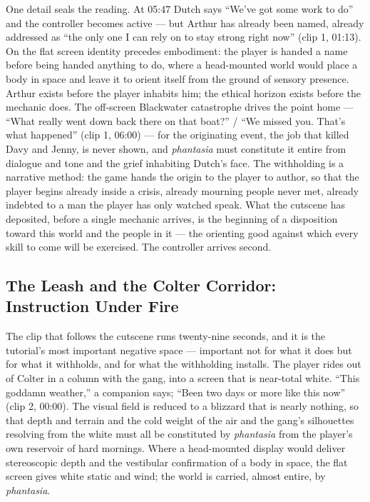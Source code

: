 One detail seals the reading. At 05:47 Dutch says ``We've got some work to do'' and the controller becomes active — but Arthur has already been named, already addressed as ``the only one I can rely on to stay strong right now'' (clip 1, 01:13). On the flat screen identity precedes embodiment: the player is handed a name before being handed anything to do, where a head-mounted world would place a body in space and leave it to orient itself from the ground of sensory presence. Arthur exists before the player inhabits him; the ethical horizon exists before the mechanic does. The off-screen Blackwater catastrophe drives the point home — ``What really went down back there on that boat?'' / ``We missed you. That's what happened'' (clip 1, 06:00) — for the originating event, the job that killed Davy and Jenny, is never shown, and \textit{phantasia} must constitute it entire from dialogue and tone and the grief inhabiting Dutch's face. The withholding is a narrative method: the game hands the origin to the player to author, so that the player begins already inside a crisis, already mourning people never met, already indebted to a man the player has only watched speak. What the cutscene has deposited, before a single mechanic arrives, is the beginning of a disposition toward this world and the people in it — the orienting good against which every skill to come will be exercised. The controller arrives second.

\bigskip

\subsection*{The Leash and the Colter Corridor: Instruction Under Fire}

The clip that follows the cutscene runs twenty-nine seconds, and it is the tutorial's most important negative space — important not for what it does but for what it withholds, and for what the withholding installs. The player rides out of Colter in a column with the gang, into a screen that is near-total white. ``This goddamn weather,'' a companion says; ``Been two days or more like this now'' (clip 2, 00:00). The visual field is reduced to a blizzard that is nearly nothing, so that depth and terrain and the cold weight of the air and the gang's silhouettes resolving from the white must all be constituted by \textit{phantasia} from the player's own reservoir of hard mornings. Where a head-mounted display would deliver stereoscopic depth and the vestibular confirmation of a body in space, the flat screen gives white static and wind; the world is carried, almost entire, by \textit{phantasia}.

